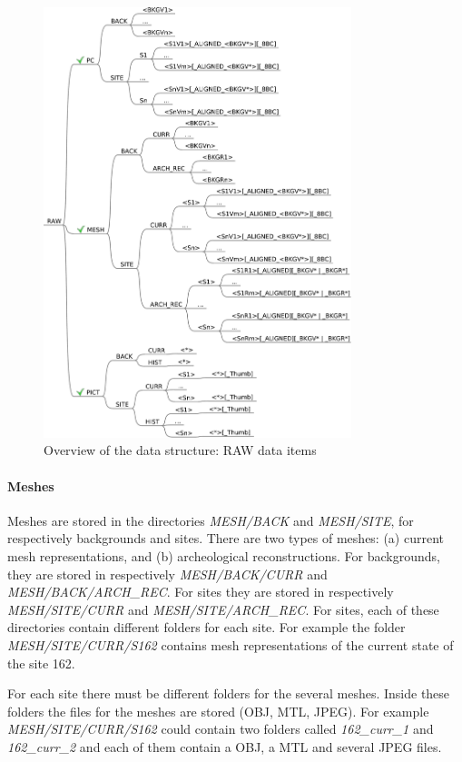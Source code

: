 \begin{figure}[]
 \centering
 \includegraphics[width=0.8\textwidth]{fig/directory_structure_raw}
 \caption{Overview of the data structure: RAW data items}
 \label{fig:directory_structure_overview_raw}
\end{figure}


\paragraph{Meshes}
Meshes are stored in the directories \textit{MESH/BACK} and \textit{MESH/SITE}, for respectively backgrounds and sites. There are two types of meshes: (a) current  mesh representations, and (b) archeological reconstructions. For backgrounds, they are stored in respectively \textit{MESH/BACK/CURR} and \textit{MESH/BACK/ARCH\_REC}. For sites they are stored in respectively \textit{MESH/SITE/CURR} and \textit{MESH/SITE/ARCH\_REC}. For sites, each of these directories contain different folders for each site. For example the folder \textit{MESH/SITE/CURR/S162} contains mesh representations of the current state of the site 162. 

For each site there must be different folders for the several meshes. Inside these folders the files for the meshes are stored (OBJ, MTL, JPEG). For example \textit{MESH/SITE/CURR/S162} could contain two folders called \textit{162\_curr\_1} and \textit{162\_curr\_2} and each of them contain a OBJ, a MTL and several JPEG files. 

